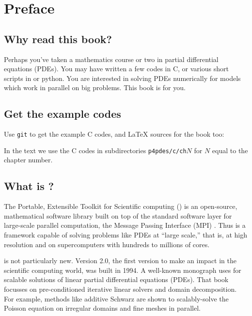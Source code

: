 \chapter*{Preface}

\section{Why read this book?}

Perhaps you've taken a mathematics course or two in partial differential equations (PDEs).  You may have written a few codes in C, or various short scripts in \Matlab or python.  You are interested in solving PDEs numerically for models which work in parallel on big problems.  This book is for you.

\section{Get the example codes}

Use \texttt{git} to get the example C codes, and \LaTeX\xspace sources for the book too:
In the text we use the C codes in subdirectories \texttt{p4pdes/c/ch}$N$ for $N$ equal to the chapter number.

\section{What is \PETSc?}

The Portable, Extensible Toolkit for Scientific computing (\PETSc) is an open-source, mathematical software library built on top of the standard software layer for large-scale parallel computation, the Message Passing Interface (MPI) \citep{Groppetal1999}.  Thus \PETSc is a framework capable of solving problems like PDEs at ``large scale,'' that is, at high resolution and on supercomputers with hundreds to millions of cores.

\PETSc is not particularly new.  Version 2.0, the first version to make an impact in the scientific computing world, was built in 1994.  A well-known monograph \citet{Smithetal1996} uses  for scalable solutions of linear partial differential equations (PDEs).  That book focusses on pre-conditioned iterative linear solvers and domain decomposition.  For example, methods like additive Schwarz are shown to scalably-solve the Poisson equation on irregular domains and fine meshes in parallel.

